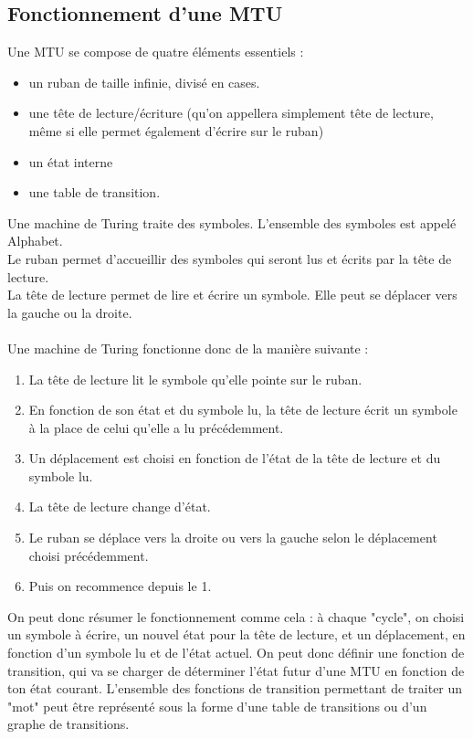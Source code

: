 \documentclass[12pt]{report}
\begin{document}
	\subsection{Fonctionnement d'une MTU}
	Une MTU se compose de quatre éléments essentiels :
	\begin{itemize}[label=$-$]
		\item un ruban de taille infinie, divisé en cases.
		\item une tête de lecture/écriture (qu'on appellera simplement tête de lecture, même si elle permet également d'écrire sur le ruban)
		\item un état interne
		\item une table de transition.
	\end{itemize}
	Une machine de Turing traite des symboles. L'ensemble des symboles est appelé Alphabet.\\
	Le ruban permet d'accueillir des symboles qui seront lus et écrits par la tête de lecture.\\
	La tête de lecture permet de lire et écrire un symbole. Elle peut se déplacer vers la gauche ou la droite.\\
	\\
	Une machine de Turing fonctionne donc de la manière suivante :
	\begin{enumerate}
		\item La tête de lecture lit le symbole qu'elle pointe sur le ruban.
		\item En fonction de son état et du symbole lu, la tête de lecture écrit un symbole à la place de celui qu'elle a lu précédemment.
		\item Un déplacement est  choisi en fonction de l'état de la tête de lecture et du symbole lu.
		\item La tête de lecture change d'état.
		\item Le ruban se déplace vers la droite ou vers la gauche selon le déplacement choisi précédemment.
		\item Puis on recommence depuis le 1.
	\end{enumerate}
	 On peut donc résumer le fonctionnement comme cela : à chaque "cycle", on choisi un symbole à écrire, un nouvel état pour la tête de lecture, et un déplacement, en fonction d'un symbole lu et de l'état actuel. On peut donc définir une fonction de transition, qui va se charger de déterminer l'état futur d'une MTU en fonction de ton état courant. L'ensemble des fonctions de transition permettant de traiter un "mot" peut être représenté sous la forme d'une table de transitions ou d'un graphe de transitions.\\
\end{document}
